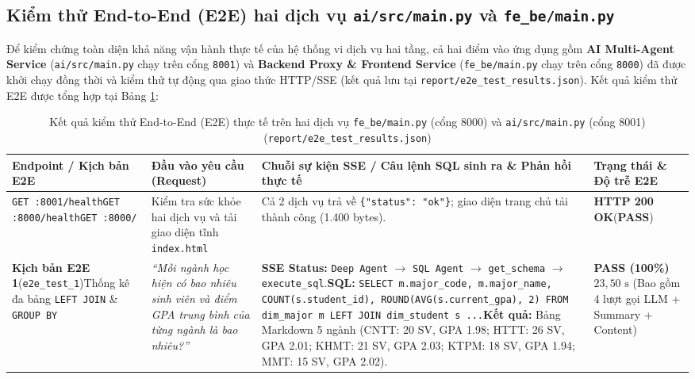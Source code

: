 \documentclass[12pt,a4paper]{report}
\begin{document}
\subsection{Kiểm thử End-to-End (E2E) hai dịch vụ \texttt{ai/src/main.py} và \texttt{fe\_be/main.py}}

Để kiểm chứng toàn diện khả năng vận hành thực tế của hệ thống vi dịch vụ hai tầng, cả hai điểm vào ứng dụng gồm \textbf{AI Multi-Agent Service} (\texttt{ai/src/main.py} chạy trên cổng \texttt{8001}) và \textbf{Backend Proxy \& Frontend Service} (\texttt{fe\_be/main.py} chạy trên cổng \texttt{8000}) đã được khởi chạy đồng thời và kiểm thử tự động qua giao thức HTTP/SSE (kết quả lưu tại \texttt{report/e2e\_test\_results.json}). Kết quả kiểm thử E2E được tổng hợp tại Bảng \ref{tab:e2e_test_results}:

\begin{table}[H]
\centering
\caption{Kết quả kiểm thử End-to-End (E2E) thực tế trên hai dịch vụ \texttt{fe\_be/main.py} (cổng 8000) và \texttt{ai/src/main.py} (cổng 8001) (\texttt{report/e2e\_test\_results.json})}
\label{tab:e2e_test_results}
\renewcommand{\arraystretch}{1.25}
\footnotesize
\begin{tabular}{@{}p{2.8cm}p{4.3cm}p{4.8cm}p{2.4cm}@{}}
\toprule
\textbf{Endpoint / Kịch bản E2E} & \textbf{Đầu vào yêu cầu (Request)} & \textbf{Chuỗi sự kiện SSE / Câu lệnh SQL sinh ra \& Phản hồi thực tế} & \textbf{Trạng thái \& Độ trễ E2E} \\
\midrule
\texttt{GET :8001/health}\newline \texttt{GET :8000/health}\newline \texttt{GET :8000/} & Kiểm tra sức khỏe hai dịch vụ và tải giao diện tĩnh \texttt{index.html} & Cả 2 dịch vụ trả về \texttt{\{"status": "ok"\}}; giao diện trang chủ tải thành công (1.400 bytes). & \textbf{HTTP 200 OK}\newline (\textbf{PASS}) \\
\addlinespace
\textbf{Kịch bản E2E 1}\newline (\texttt{e2e\_test\_1})\newline Thống kê đa bảng \texttt{LEFT JOIN} \& \texttt{GROUP BY} & \textit{``Mỗi ngành học hiện có bao nhiêu sinh viên và điểm GPA trung bình của từng ngành là bao nhiêu?''} & \textbf{SSE Status:} \texttt{Deep Agent} $\rightarrow$ \texttt{SQL Agent} $\rightarrow$ \texttt{get\_schema} $\rightarrow$ \texttt{execute\_sql}.\newline \textbf{SQL:} \texttt{SELECT m.major\_code, m.major\_name, COUNT(s.student\_id), ROUND(AVG(s.current\_gpa), 2) FROM dim\_major m LEFT JOIN dim\_student s ...}\newline \textbf{Kết quả:} Bảng Markdown 5 ngành (CNTT: 20 SV, GPA 1.98; HTTT: 26 SV, GPA 2.01; KHMT: 21 SV, GPA 2.03; KTPM: 18 SV, GPA 1.94; MMT: 15 SV, GPA 2.02). & \textbf{PASS (100\%)}\newline $23{,}50\text{ s}$ (Bao gồm 4 lượt gọi LLM + Summary + Content) \\

\end{tabular}
\end{table}
\end{document}
